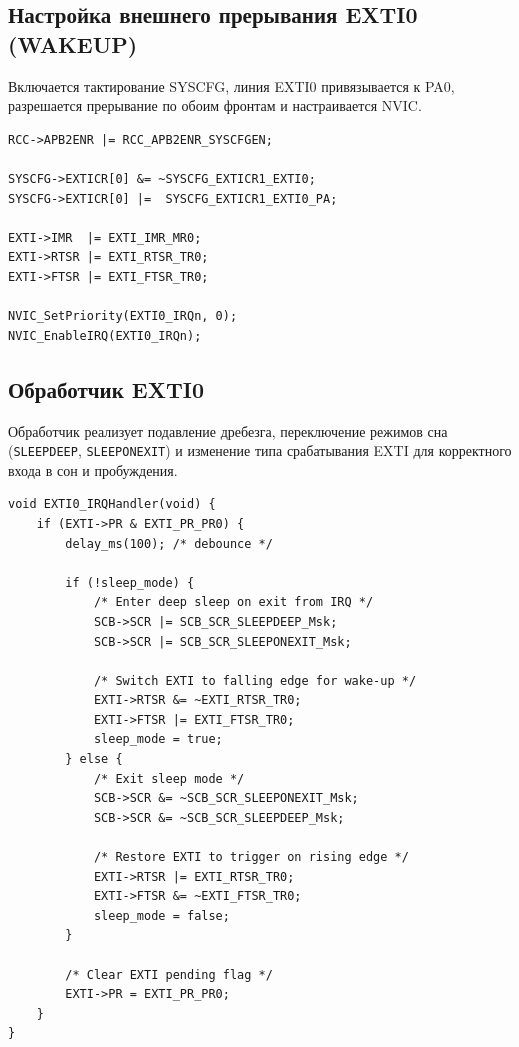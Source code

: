 \subsection{Настройка внешнего прерывания EXTI0 (WAKEUP)}

Включается тактирование SYSCFG, линия EXTI0 привязывается к PA0, разрешается прерывание по обоим фронтам и настраивается NVIC.

\begin{listing}[H]
\caption{EXTI0 setup}
\begin{verbatim}
RCC->APB2ENR |= RCC_APB2ENR_SYSCFGEN;

SYSCFG->EXTICR[0] &= ~SYSCFG_EXTICR1_EXTI0;
SYSCFG->EXTICR[0] |=  SYSCFG_EXTICR1_EXTI0_PA;

EXTI->IMR  |= EXTI_IMR_MR0;
EXTI->RTSR |= EXTI_RTSR_TR0;
EXTI->FTSR |= EXTI_FTSR_TR0;

NVIC_SetPriority(EXTI0_IRQn, 0);
NVIC_EnableIRQ(EXTI0_IRQn);
\end{verbatim}
\end{listing}

\subsection{Обработчик EXTI0}

Обработчик реализует подавление дребезга, переключение режимов сна (\verb|SLEEPDEEP|, \verb|SLEEPONEXIT|) и изменение типа срабатывания EXTI для корректного входа в сон и пробуждения.

\begin{listing}[H]
\caption{EXTI0 IRQ Handler}
\begin{verbatim}
void EXTI0_IRQHandler(void) {
    if (EXTI->PR & EXTI_PR_PR0) {
        delay_ms(100); /* debounce */

        if (!sleep_mode) {
            /* Enter deep sleep on exit from IRQ */
            SCB->SCR |= SCB_SCR_SLEEPDEEP_Msk;
            SCB->SCR |= SCB_SCR_SLEEPONEXIT_Msk;

            /* Switch EXTI to falling edge for wake-up */
            EXTI->RTSR &= ~EXTI_RTSR_TR0;
            EXTI->FTSR |= EXTI_FTSR_TR0;
            sleep_mode = true;
        } else {
            /* Exit sleep mode */
            SCB->SCR &= ~SCB_SCR_SLEEPONEXIT_Msk;
            SCB->SCR &= ~SCB_SCR_SLEEPDEEP_Msk;

            /* Restore EXTI to trigger on rising edge */
            EXTI->RTSR |= EXTI_RTSR_TR0;
            EXTI->FTSR &= ~EXTI_FTSR_TR0;
            sleep_mode = false;
        }

        /* Clear EXTI pending flag */
        EXTI->PR = EXTI_PR_PR0;
    }
}
\end{verbatim}
\end{listing}

